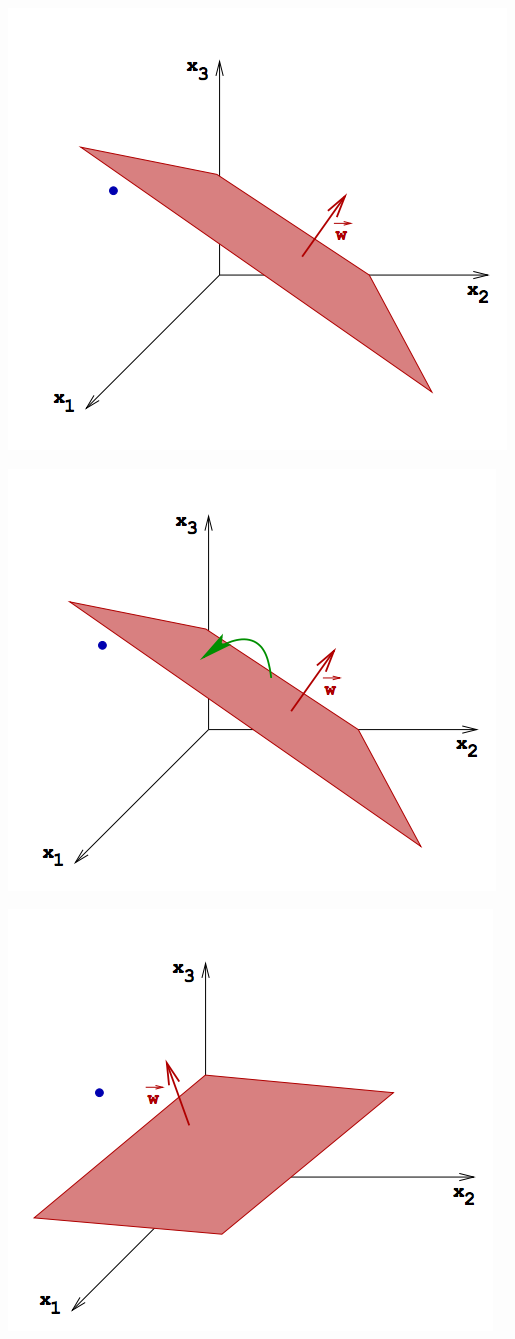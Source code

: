 \documentclass[10pt]{beamer}
\begin{document}
\begin{frame}
  \centering
  \includegraphics[width=0.8 \textwidth, keepaspectratio]{images/geometry11}
\end{frame}

\begin{frame}
  \centering
  \includegraphics[width=0.8 \textwidth, keepaspectratio]{images/geometry12}
\end{frame}

\begin{frame}
  \centering
  \includegraphics[width=0.8 \textwidth, keepaspectratio]{images/geometry13}
\end{frame}
\end{document}
